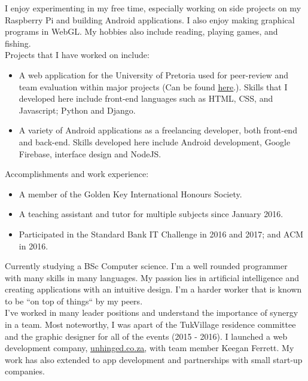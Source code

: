     I enjoy experimenting in my free time, especially working on side projects on my Raspberry Pi and building Android applications. I also enjoy making graphical programs in WebGL. My hobbies also include reading, playing games, and fishing. \\
    
    \noindent
    Projects that I have worked on include:
    \begin{itemize}
        \item A web application for the University of Pretoria used for peer-review and team evaluation within major projects (Can be found \href{https://github.com/teampinocchio/pinocchio/wiki}{\underline{here}}.). Skills that I developed here include front-end languages such as HTML, CSS, and Javascript; Python and Django.
    
        \item A variety of Android applications as a freelancing developer, both front-end and back-end. Skills developed here include Android development, Google Firebase, interface design and NodeJS.
    \end{itemize}
    
    \noindent
	Accomplishments and work experience:
    \begin{itemize}
        \item A member of the Golden Key International Honours Society.
        \item A teaching assistant and tutor for multiple subjects since January 2016.
        \item Participated in the Standard Bank IT Challenge in 2016 and 2017; and ACM in 2016.
    \end{itemize}

%
%
\newpage
{}
	Currently studying a BSc Computer science. I'm a well rounded programmer with many skills in many languages. My passion lies in artificial intelligence and creating applications with an intuitive design. I'm a harder worker that is known to be ``on top of things`` by my peers. \\ 

	I've worked in many leader positions and understand the importance of synergy in a team. Most noteworthy, I was apart of the TukVillage residence committee and the graphic designer for all of the events (2015 - 2016). I launched a web development company, \href{www.unhinged.co.za}{\underline{unhinged.co.za}}, with team member Keegan Ferrett. My work has also extended to app development and partnerships with small start-up companies.\\

